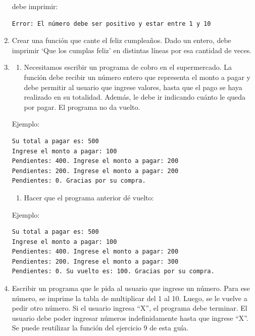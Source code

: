 \documentclass[
  letterpaper,
  DIV=11,
  numbers=noendperiod]{scrreprt}
\providecommand{\tightlist}{%
  \setlength{\itemsep}{0pt}\setlength{\parskip}{0pt}}\usepackage{longtable,booktabs,array}
\begin{document}
\begin{enumerate}
  debe imprimir:

\begin{verbatim}
Error: El número debe ser positivo y estar entre 1 y 10
\end{verbatim}
\item
  Crear una función que cante el feliz cumpleaños. Dado un entero, debe
  imprimir `Que los cumplas feliz' en distintas líneas por esa cantidad
  de veces.
\item
  \begin{enumerate}
  \def\labelenumii{\alph{enumii}.}
  \tightlist
  \item
    Necesitamos escribir un programa de cobro en el supermercado. La
    función debe recibir un número entero que representa el monto a
    pagar y debe permitir al usuario que ingrese valores, hasta que el
    pago se haya realizado en su totalidad. Además, le debe ir indicando
    cuánto le queda por pagar. El programa no da vuelto.
  \end{enumerate}

  Ejemplo:

\begin{verbatim}
Su total a pagar es: 500
Ingrese el monto a pagar: 100
Pendientes: 400. Ingrese el monto a pagar: 200
Pendientes: 200. Ingrese el monto a pagar: 200
Pendientes: 0. Gracias por su compra.
\end{verbatim}

  \begin{enumerate}
  \def\labelenumii{\alph{enumii}.}
  \setcounter{enumii}{1}
  \tightlist
  \item
    Hacer que el programa anterior dé vuelto:
  \end{enumerate}

  Ejemplo:

\begin{verbatim}
Su total a pagar es: 500
Ingrese el monto a pagar: 100
Pendientes: 400. Ingrese el monto a pagar: 200
Pendientes: 200. Ingrese el monto a pagar: 300
Pendientes: 0. Su vuelto es: 100. Gracias por su compra.
\end{verbatim}
\item
  Escribir un programa que le pida al usuario que ingrese un número.
  Para ese número, se imprime la tabla de multiplicar del 1 al 10.
  Luego, se le vuelve a pedir otro número. Si el usuario ingresa ``X'',
  el programa debe terminar. El usuario debe poder ingresar números
  indefinidamente hasta que ingrese ``X''. Se puede reutilizar la
  función del ejercicio 9 de esta guía.


\end{enumerate}
\end{document}
